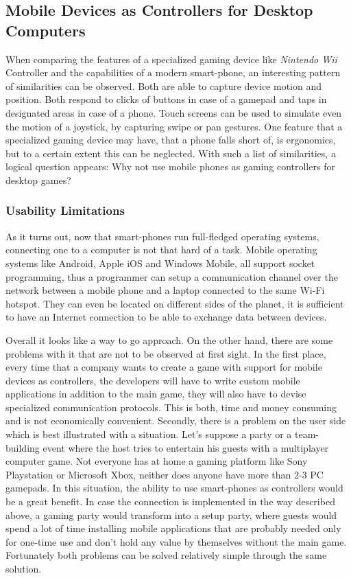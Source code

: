 
\subsection{Mobile Devices as Controllers for Desktop Computers}

When comparing the features of a specialized gaming device like \emph{Nintendo
Wii}\cite{wiimote} Controller and the capabilities of a modern smart-phone, an interesting
pattern of similarities can be observed. Both are able to capture device
motion and position. Both respond to clicks of buttons in case of a gamepad
and taps in designated areas in case of a phone. Touch screens can be used to
simulate even the motion of a joystick, by capturing swipe or pan gestures.
One feature that a specialized gaming device may have, that a phone falls
short of, is ergonomics, but to a certain extent this can be neglected. With
such a list of similarities, a logical question appears: Why not use mobile
phones as gaming controllers for desktop games?


\subsubsection{Usability Limitations}

As it turns out, now that smart-phones run full-fledged operating systems,
connecting one to a computer is not that hard of a task. Mobile operating
systems like Android, Apple iOS and Windows Mobile, all support socket
programming, thus a programmer can setup a communication channel over the
network between a mobile phone and a laptop connected to the same Wi-Fi
hotspot. They can even be located on different sides of the planet, it is
sufficient to have an Internet connection to be able to exchange data between
devices.

Overall it looks like a way to go approach. On the other hand, there are some
problems with it that are not to be observed at first sight. In the first
place, every time that a company wants to create a game with support for
mobile devices as controllers, the developers will have to write custom mobile
applications in addition to the main game, they will also have to devise
specialized communication protocols. This is both, time and money consuming
and is not economically convenient. Secondly, there is a problem on the user
side which is best illustrated with a situation. Let's suppose a party or a
team-building event where the host tries to entertain his guests with a
multiplayer computer game. Not everyone has at home a gaming platform like
Sony Playstation or Microsoft Xbox, neither does anyone have more than 2-3 PC
gamepads. In this situation, the ability to use smart-phones as controllers
would be a great benefit. In case the connection is implemented in the way
described above, a gaming party would transform into a setup party, where
guests would spend a lot of time installing mobile applications that are
probably needed only for one-time use and don't hold any value by themselves
without the main game. Fortunately both problems can be solved relatively
simple through the same solution.


